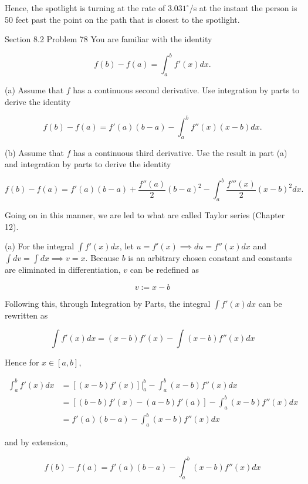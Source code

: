 \documentclass{article}
\begin{document}
    Hence, the spotlight is turning at the rate of $3.031^{\circ}$/s at the instant the person is 50 feet past the point on the path that is closest to the spotlight.


    \pagebreak
    \thispagestyle{5}

    \begin{tbhtheorem}{Section 8.2 Problem 78}
        You are familiar with the identity

        \[
            f(b) - f(a) = \int_a^b f'(x)dx.
        \]

        (a) Assume that $f$ has a continuous second derivative. Use integration by parts to derive the identity

        \[
            f(b) - f(a) = f'(a)(b-a)-\int_a^b f''(x)(x-b)dx.
        \]

        (b) Assume that $f$ has a continuous third derivative. Use the result in part (a) and integration by parts to derive the identity

        \[
            f(b) - f(a) = f'(a)(b-a) + \frac{f''(a)}{2}(b-a)^2 - \int_a^b \frac{f'''(x)}{2}(x-b)^2 dx.
        \]

        Going on in this manner, we are led to what are called Taylor series (Chapter 12).
    \end{tbhtheorem}

    (a) For the integral $\int f'(x)dx$, let $u=f'(x)\implies du=f''(x)dx$ and $\int dv = \int dx\implies v = x$. Because $b$ is an arbitrary chosen constant and constants are eliminated in differentiation, $v$ can be
    redefined as

    \[
        v:=x-b
    \]

    Following this, through Integration by Parts, the integral $\int f'(x)dx$ can be rewritten as

    \[
        \int f'(x)dx=(x-b)f'(x)-\int (x-b)f''(x)dx
    \]

    Hence for $x\in[a,b]$,

    \begin{align*}
        \int_a^b f'(x)dx    &= \left[(x-b)f'(x)\right]\Big|_a^b-\int_a^b (x-b)f''(x)dx \\
                            &= \left[(b-b)f'(x)-(a-b)f'(a)\right]-\int_a^b (x-b)f''(x)dx \\
                            &= f'(a)(b-a)-\int_a^b (x-b)f''(x)dx
    \end{align*}

    and by extension,

    \[
        f(b) - f(a) = f'(a)(b-a)-\int_a^b (x-b)f''(x)dx
    \]
\end{document}
